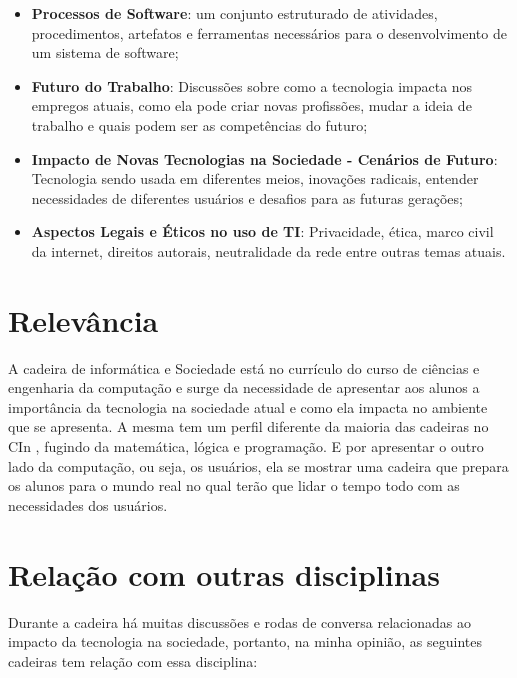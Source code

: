 \documentclass[10pt]{article}
\begin{document}
\begin{itemize}
    \item \textbf{Processos de Software}: um conjunto estruturado de atividades, procedimentos, artefatos e ferramentas necessários para o desenvolvimento de um sistema de software;

    \item \textbf{Futuro do Trabalho}: Discussões sobre como a
tecnologia impacta nos empregos atuais, como ela pode criar novas profissões, mudar a ideia de trabalho e quais podem ser as competências do futuro;
        
    \item \textbf{Impacto de Novas Tecnologias na Sociedade - Cenários de Futuro}: Tecnologia sendo usada em diferentes meios, inovações radicais, entender necessidades de diferentes usuários e desafios para as futuras gerações;
    
    \item \textbf{Aspectos Legais e Éticos no uso de TI}: Privacidade, ética, marco civil da internet, direitos autorais, neutralidade da rede entre outras temas atuais.
    
\end{itemize}

\section{Relevância}
A cadeira de informática e Sociedade está no currículo do curso de ciências
e engenharia da computação e surge da necessidade de apresentar aos alunos a importância da tecnologia na sociedade atual e como ela impacta no ambiente que se apresenta. A mesma tem um perfil diferente da maioria das cadeiras no CIn
, fugindo da matemática, lógica e programação. E por apresentar o outro lado da computação, ou seja, os usuários, ela se mostrar uma cadeira que prepara os alunos para o mundo real no qual terão que lidar o tempo todo com as necessidades dos usuários.

\section{Relação com outras disciplinas}
Durante a cadeira há muitas discussões e rodas de conversa relacionadas ao impacto da tecnologia na sociedade, portanto, na minha opinião, as seguintes cadeiras tem relação com essa disciplina:

\begin{table}[h]
\end{table}



\end{document}
